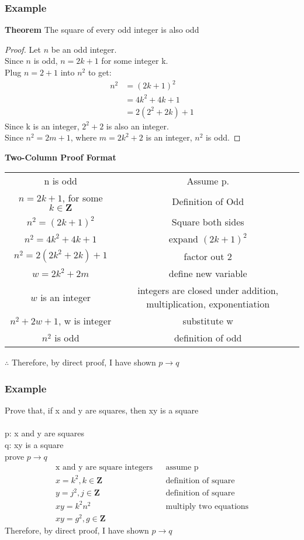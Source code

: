 \documentclass[12pt]{article}
\begin{document}
\subsubsection{Example}
\textbf{Theorem} \quad The square of every odd integer is also odd\\
\begin{proof}
	Let $n$ be an odd integer.\\
	Since $n$ is odd, $n = 2k + 1$ for some integer k. \\
	Plug $n = 2 + 1$ into $n^2$ to get: \\
	\begin{align}
		n^2 &= (2k + 1)^2 \\
			&= 4k^2 + 4k + 1 \\
			&= 2(2^2 + 2k) + 1
	\end{align}
	Since k is an integer, $2^2 + 2$ is also an integer. \\
	Since $n^2 = 2m + 1$, where $m = 2k^2 + 2$ is an integer, $n^2$ is odd.
\end{proof}

\textbf{Two-Column Proof Format} \\
\begin{tabular}{c|c}
	n is odd & Assume p. \\
	$n = 2k + 1$, for some $k \in \mathbf{Z}$ & Definition of Odd \\
	$n^2 = (2k + 1)^2$ & Square both sides \\
	$n^2 = 4k^2 + 4k + 1$ & expand $(2k+1)^2$ \\
	$n^2 = 2(2k^2 + 2k) + 1$ & factor out 2 \\
	$w = 2k^2 + 2m$ & define new variable \\
	$w$ is an integer & integers are closed under addition, multiplication, exponentiation \\
	$n^2 + 2w + 1$, w is integer & substitute w \\
	$n^2$ is odd & definition of odd \\
\end{tabular}
$\therefore$ Therefore, by direct proof, I have shown $p \rightarrow q$
\subsubsection{Example}
Prove that, if x and y are squares, then xy is a square \\\\
p: x and y are squares\\
q: xy is a square \\
prove $p \rightarrow q$
\begin{align*}
	\text{x and y are square integers} && \text{assume p} \\
	x = k^2, k \in \mathbf{Z} && \text{definition of square} \\
	y = j^2, j \in \mathbf{Z} && \text{definition of square} \\
	xy = k^2n^2 && \text{multiply two equations} \\
	xy = g^2, g \in \mathbf{Z}
\end{align*}
Therefore, by direct proof, I have shown $p \rightarrow q$
\end{document}
